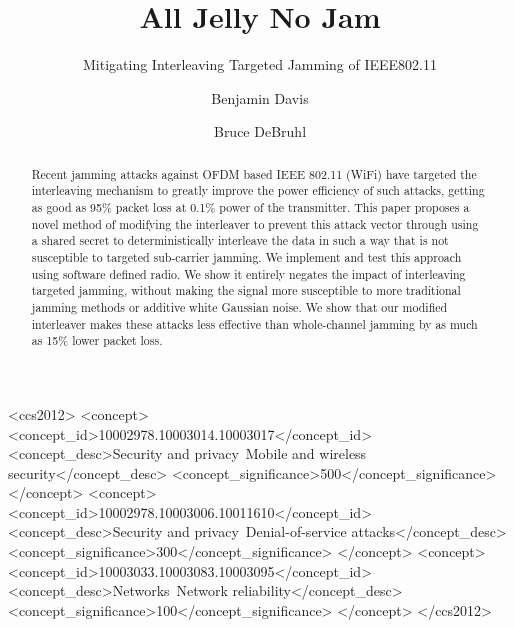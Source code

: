 \documentclass[sigconf]{acmart}
\begin{document}
\title{All Jelly No Jam}
\subtitle{Mitigating Interleaving Targeted Jamming of IEEE802.11}

\author{Benjamin Davis}

\author{Bruce DeBruhl}


\renewcommand{\shortauthors}{Davis and DeBruhl}

\begin{abstract}
  Recent jamming attacks against OFDM based IEEE 802.11 (WiFi) have targeted the interleaving mechanism to greatly improve the power efficiency of such attacks, getting as good as 95\% packet loss at 0.1\% power of the transmitter. This paper proposes a novel method of modifying the interleaver to prevent this attack vector through using a shared secret to deterministically interleave the data in such a way that is not susceptible to targeted sub-carrier jamming. We implement and test this approach using software defined radio. We show it entirely negates the impact of interleaving targeted jamming, without making the signal more susceptible to more traditional jamming methods or additive white Gaussian noise. We show that our modified interleaver makes these attacks less effective than whole-channel jamming by as much as 15\% lower packet loss.
\end{abstract}

\begin{CCSXML}
<ccs2012>
<concept>
<concept_id>10002978.10003014.10003017</concept_id>
<concept_desc>Security and privacy~Mobile and wireless security</concept_desc>
<concept_significance>500</concept_significance>
</concept>
<concept>
<concept_id>10002978.10003006.10011610</concept_id>
<concept_desc>Security and privacy~Denial-of-service attacks</concept_desc>
<concept_significance>300</concept_significance>
</concept>
<concept>
<concept_id>10003033.10003083.10003095</concept_id>
<concept_desc>Networks~Network reliability</concept_desc>
<concept_significance>100</concept_significance>
</concept>
</ccs2012>
\end{CCSXML}
\end{document}
